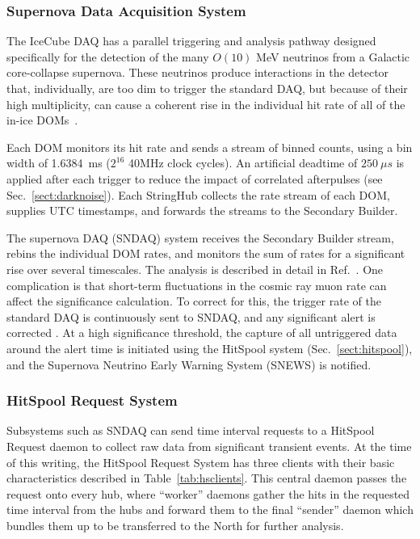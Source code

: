 \subsubsection{\label{sect:SNDAQ}Supernova Data Acquisition System}

The IceCube DAQ has a parallel triggering and analysis pathway designed
specifically for the detection of the many $O(10)$ MeV neutrinos from a Galactic
core-collapse supernova. These neutrinos produce interactions in the
detector that, individually, are too dim to trigger the standard DAQ, but because of their
high multiplicity, can cause a coherent rise in the individual hit rate of all
of the in-ice DOMs~\cite{IC3:supernova}. 

Each DOM monitors its hit rate and sends a stream of binned
counts, using a bin width of 1.6384~ms ($2^{16}$ 40MHz clock cycles).  An
artificial deadtime of $250\ {\mu}s$ is applied after each trigger to
reduce the impact of correlated afterpulses (see
Sec.~\ref{sect:darknoise}).  Each StringHub
collects the rate stream of each DOM, supplies UTC timestamps, and
forwards the streams to the Secondary Builder.  

The supernova DAQ (SNDAQ) system receives the Secondary Builder stream,
rebins the individual DOM rates, and monitors the sum of rates for a
significant rise over several timescales.  The analysis is described in
detail in Ref.~\cite{IC3:supernova}.  One complication is that short-term
fluctuations in the cosmic ray muon rate can affect the significance
calculation.  To correct for this, the trigger rate of the standard DAQ is
continuously sent to SNDAQ, and any significant alert is corrected
\cite{IC3:icrc15_sndaq}.  At a 
high significance threshold, the capture of all untriggered data around the
alert time is initiated using the HitSpool system
(Sec.~\ref{sect:hitspool}), and the Supernova Neutrino Early Warning
System (SNEWS) \cite{SNEWS} is notified.

\subsubsection{\label{sect:hitspool}HitSpool Request System}

Subsystems such as SNDAQ can send time interval requests to a HitSpool
Request daemon to collect raw data from significant transient events. At the time of this writing, the HitSpool Request
System has three clients with their basic characteristics described in
Table~\ref{tab:hsclients}. This central daemon passes the request onto
every hub, where ``worker'' daemons gather the hits in the requested
time interval from the hubs and forward them to the final ``sender''
daemon which bundles them up to be transferred to the North for
further analysis. 


